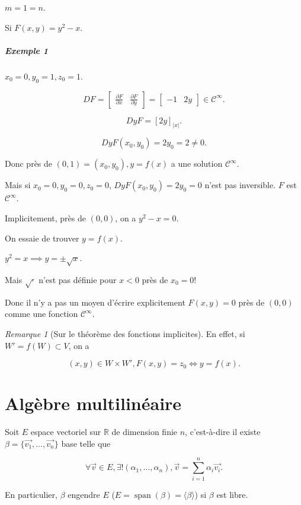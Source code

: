 \documentclass[french]{article}
\theoremstyle{definition}
\theoremstyle{remark}
\newtheorem*{remark}{Remarque}
\newcommand{\lesss}{<}
\newcommand{\less}{\lesss}
\begin{document}
$m=1=n$.

Si $F(x, y) = y ^2-x$.

\subparagraph{Exemple 1} $x_0 = 0, y_0 =1 , z_0 =1$.

\[
DF = \left[\begin{matrix}
  \frac{\partial F }{\partial x} & \frac{\partial F }{\partial y }
\end{matrix}\right] = \left[\begin{matrix}
  -1 & 2y
\end{matrix}\right] \in \mathcal{C}^\infty.
\]

\[
DyF = [2y] _{|x|}.
\]

\[
DyF(x_0, y_0) = 2 y_0 = 2 \neq 0.
\]

Donc près de $(0, 1) = (x_0, y_0), y= f(x)$ a une solution $\mathcal{C} ^{\infty}$.

Mais si $x_0 = 0, y_0 = 0, z_0 = 0$, $DyF(x_0, y_0)=2y_0=0$ n'est pas inversible. $F$ est $\mathcal{C}^\infty$.

Implicitement, près de $(0, 0)$, on a $y ^2 - x = 0$.

On essaie de trouver $y=f(x)$.

$y ^2 = x \implies y = \pm \sqrt{ x } $.

Mais $\sqrt{\cdot} $ n'est pas définie pour $x \less 0$ près de $x_0 = 0$!

Donc il n'y a pas un moyen d'écrire explicitement $F(x,y) = 0$ près de $(0, 0)$ comme une fonction $\mathcal{C}^\infty$.

\begin{remark}[Sur le théorème des fonctions implicites]
  En effet, si $W' = f(W) \subset V$, on a

  \[
  (x,y) \in W \times W', F(x,y) = z_0 \iff y=f(x).
  \]
\end{remark}

\section{Algèbre multilinéaire}

Soit $E$ espace vectoriel sur $\mathbb{R}$ de dimension finie $n$, c'est-à-dire il existe $\beta = \{ \overrightarrow{ v_1 }, \dots, \overrightarrow{ v_n }   \} $ base telle que

\[
\forall \overrightarrow{ v } \in E, \exists ! (\alpha_1, \dots, \alpha_n), \overrightarrow{ v } = \sum_{i=1}^{n} \alpha_i \overrightarrow{ v_i }.
\]

En particulier, $\beta $ engendre $E$ ($E = \operatorname{span}(\beta) = \langle \beta \rangle $) si $\beta$ est libre.
\end{document}

